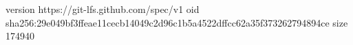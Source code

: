 version https://git-lfs.github.com/spec/v1
oid sha256:29e049bf3ffeae11cecb14049c2d96c1b5a4522dffcc62a35f373262794894ce
size 174940
